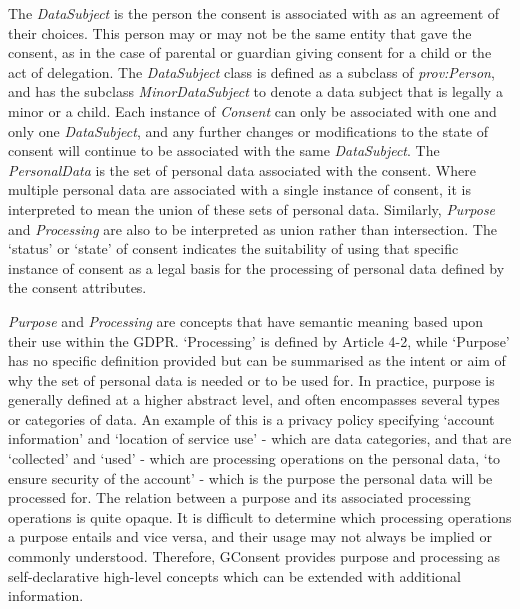 The \textit{DataSubject} is the person the consent is associated with as an agreement of their choices. This person may or may not be the same entity that gave the consent, as in the case of parental or guardian giving consent for a child or the act of delegation. The \textit{DataSubject} class is defined as a subclass of \textit{prov:Person}, and has the subclass \textit{MinorDataSubject} to denote a data subject that is legally a minor or a child.
Each instance of \textit{Consent} can only be associated with one and only one \textit{DataSubject}, and any further changes or modifications to the state of consent will continue to be associated with the same \textit{DataSubject}.
The \textit{PersonalData} is the set of personal data associated with the consent. Where multiple personal data are associated with a single instance of consent, it is interpreted to mean the union of these sets of personal data. Similarly, \textit{Purpose} and \textit{Processing} are also to be interpreted as union rather than intersection.
The `status' or `state' of consent indicates the suitability of using that specific instance of consent as a legal basis for the processing of personal data defined by the consent attributes.

\textit{Purpose} and \textit{Processing} are concepts that have semantic meaning based upon their use within the GDPR.
`Processing' is defined by Article 4-2, while `Purpose' has no specific definition provided but can be summarised as the intent or aim of why the set of personal data is needed or to be used for. In practice, purpose is generally defined at a higher abstract level, and often encompasses several types or categories of data. An example of this is a privacy policy specifying `account information' and `location of service use' - which are data categories, and that are `collected' and `used' - which are processing operations on the personal data, `to ensure security of the account' - which is the purpose the personal data will be processed for. The relation between a purpose and its associated processing operations is quite opaque. It is difficult to determine which processing operations a purpose entails and vice versa, and their usage may not always be implied or commonly understood. Therefore, GConsent provides purpose and processing as self-declarative high-level concepts which can be extended with additional information.


